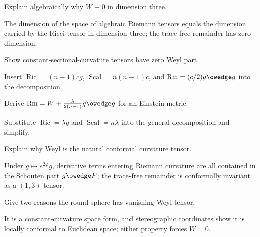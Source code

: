 \begin{problem}\label{prob:vii28-03}
Explain algebraically why \(W\equiv0\) in dimension three.
\end{problem}
\begin{solution}
The dimension of the space of algebraic Riemann tensors equals the dimension carried by the Ricci tensor in dimension three; the trace-free remainder has zero dimension.
\end{solution}

\begin{problem}\label{prob:vii28-04}
Show constant-sectional-curvature tensors have zero Weyl part.
\end{problem}
\begin{solution}
Insert \(\operatorname{Ric}=(n-1)cg\), \(\operatorname{Scal}=n(n-1)c\), and \(\operatorname{Rm}=(c/2)g\owedge g\) into the decomposition.
\end{solution}

\begin{problem}\label{prob:vii28-05}
Derive \(\operatorname{Rm}=W+\frac{\lambda}{2(n-1)}g\owedge g\) for an Einstein metric.
\end{problem}
\begin{solution}
Substitute \(\operatorname{Ric}=\lambda g\) and \(\operatorname{Scal}=n\lambda\) into the general decomposition and simplify.
\end{solution}

\begin{problem}\label{prob:vii28-06}
Explain why Weyl is the natural conformal curvature tensor.
\end{problem}
\begin{solution}
Under \(g\mapsto e^{2\varphi}g\), derivative terms entering Riemann curvature are all contained in the Schouten part \(g\owedge P\); the trace-free remainder is conformally invariant as a \((1,3)\)-tensor.
\end{solution}

\begin{problem}\label{prob:vii28-07}
Give two reasons the round sphere has vanishing Weyl tensor.
\end{problem}
\begin{solution}
It is a constant-curvature space form, and stereographic coordinates show it is locally conformal to Euclidean space; either property forces \(W=0\).
\end{solution}

